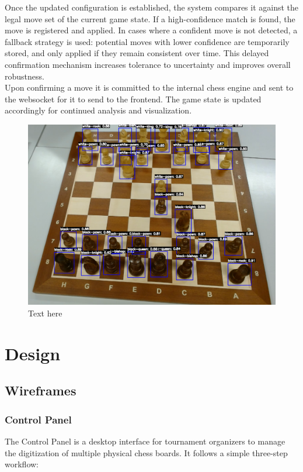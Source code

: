 Once the updated configuration is established, the system compares it against the legal move set of the current game state. If a high-confidence match is found, the move is registered and applied. In cases where a confident move is not detected, a fallback strategy is used: potential moves with lower confidence are temporarily stored, and only applied if they remain consistent over time. This delayed confirmation mechanism increases tolerance to uncertainty and improves overall robustness. \\

Upon confirming a move it is committed to the internal chess engine and sent to the websocket for it to send to the frontend. The game state is updated accordingly for continued analysis and visualization.\\

\begin{figure}[h!]
    \centering
    \includegraphics[width=0.75\linewidth]{figures/methods/ml-models/piece-model.png}
    \caption[s]{Text here}
    \label{fig:websocket-vs-http}
\end{figure}

\section{Design}

\subsection{Wireframes}
\label{subsec:wireframe}

\subsubsection*{Control Panel}

The Control Panel is a desktop interface for tournament organizers to manage the digitization of multiple physical chess boards. It follows a simple three-step workflow:

